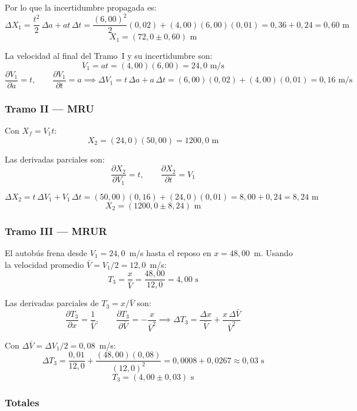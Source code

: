 Por lo que la incertidumbre propagada es:
\[
\Delta X_1 = \frac{t^2}{2}\,\Delta a + at\,\Delta t
           = \frac{(6{,}00)^2}{2}(0{,}02) + (4{,}00)(6{,}00)(0{,}01)
           = 0{,}36 + 0{,}24 = 0{,}60 \text{ m}
\]
\[
\boxed{X_1 = (72{,}0 \pm 0{,}60) \text{ m}}
\]

La velocidad al final del Tramo~I y su incertidumbre son:
\[
V_1 = at = (4{,}00)(6{,}00) = 24{,}0 \text{ m/s}
\]
\[
\frac{\partial V_1}{\partial a} = t, \qquad \frac{\partial V_1}{\partial t} = a
\implies
\Delta V_1 = t\,\Delta a + a\,\Delta t = (6{,}00)(0{,}02) + (4{,}00)(0{,}01) = 0{,}16 \text{ m/s}
\]

\subsubsection*{Tramo II — MRU}

Con $X_f = V_1 t$:
\[
X_2 = (24{,}0)(50{,}00) = 1200{,}0 \text{ m}
\]

Las derivadas parciales son:
\[
\frac{\partial X_2}{\partial V_1} = t, \qquad
\frac{\partial X_2}{\partial t} = V_1
\]

\[
\Delta X_2 = t\,\Delta V_1 + V_1\,\Delta t
           = (50{,}00)(0{,}16) + (24{,}0)(0{,}01)
           = 8{,}00 + 0{,}24 = 8{,}24 \text{ m}
\]
\[
\boxed{X_2 = (1200{,}0 \pm 8{,}24) \text{ m}}
\]

\subsubsection*{Tramo III — MRUR}

El autobús frena desde $V_1 = 24{,}0$~m/s hasta el reposo en
$x = 48{,}00$~m. Usando la velocidad promedio $\bar{V} = V_1/2 = 12{,}0$~m/s:
\[
T_3 = \frac{x}{\bar{V}} = \frac{48{,}00}{12{,}0} = 4{,}00 \text{ s}
\]

Las derivadas parciales de $T_3 = x/\bar{V}$ son:
\[
\frac{\partial T_3}{\partial x} = \frac{1}{\bar{V}}, \qquad
\frac{\partial T_3}{\partial \bar{V}} = -\frac{x}{\bar{V}^2}
\implies
\Delta T_3 = \frac{\Delta x}{\bar{V}} + \frac{x\,\Delta\bar{V}}{\bar{V}^2}
\]

Con $\Delta\bar{V} = \Delta V_1/2 = 0{,}08$~m/s:
\[
\Delta T_3 = \frac{0{,}01}{12{,}0} + \frac{(48{,}00)(0{,}08)}{(12{,}0)^2}
           = 0{,}0008 + 0{,}0267 \approx 0{,}03 \text{ s}
\]
\[
\boxed{T_3 = (4{,}00 \pm 0{,}03) \text{ s}}
\]

\subsubsection*{Totales}

